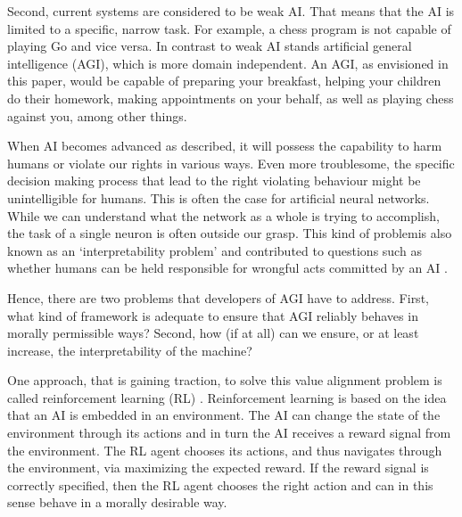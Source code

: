 Second, current systems are considered to be weak AI. That means that the AI is limited to a specific, narrow task. For example, a chess program is not capable of playing Go and vice versa. In contrast to weak AI stands artificial general intelligence (AGI), which is more domain independent. An AGI, as envisioned in this paper, would be capable of preparing your breakfast, helping your children do their homework, making appointments on your behalf, as well as playing chess against you, among other things.


When AI becomes advanced as described, it will possess the capability to harm humans or violate our rights in various ways. Even more troublesome, the specific decision making process that lead to the right violating behaviour might be unintelligible for humans. This is often the case for artificial neural networks. While we can understand what the network as a whole is trying to accomplish, the task of a single neuron is often outside our grasp. This kind of problemis also known as an `interpretability problem' and contributed to questions such as whether humans can be held responsible for wrongful acts committed by an AI \citep{sparrow2007killer,swoboda2018responsibility}.

Hence, there are two problems that developers of AGI have to address. First, what kind of framework is adequate to ensure that AGI reliably behaves in morally permissible ways? Second, how (if at all) can we ensure, or at least increase, the interpretability of the machine?  

One approach, that is gaining traction, to solve this value alignment problem is called reinforcement learning (RL) \citep{soares2015value}. Reinforcement learning is based on the idea that an AI is embedded in an environment. The AI can change the state of the environment through its actions and in turn the AI receives a reward signal from the environment. The RL agent chooses its actions, and thus navigates through the environment, via maximizing the expected reward. If the reward signal is correctly specified, then the RL agent chooses the right action and can in this sense behave in a morally desirable way.

